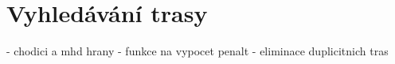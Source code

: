 \chapter{Vyhledávání trasy}
    - chodici a mhd hrany
    - funkce na vypocet penalt
    - eliminace duplicitnich tras
